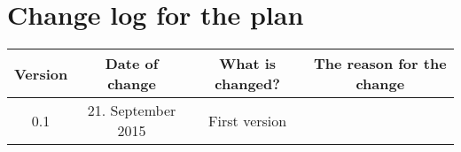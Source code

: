 \section{Change log for the plan}
\begin{tabular}{|c|c|c|c|} 
    \hline
    Version & Date of change & What is changed? & The reason for the change \\
    \hline\hline
    0.1 & 21. September 2015 & First version & \\
   \hline
\end{tabular}